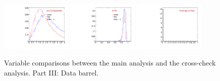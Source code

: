 \begin{figure}
  \includegraphics[width=0.3\textwidth]{Figures/VariablesComparison/Data_barrel_figs/pvips}
  \includegraphics[width=0.3\textwidth]{Figures/VariablesComparison/Data_barrel_figs/pvw8}
  \includegraphics[width=0.3\textwidth]{Figures/VariablesComparison/Data_barrel_figs/KS}
  \caption{Variable comparisons between the main analysis and the cross-check analysis. Part III: Data barrel.}
  \label{fig:Data_barrel_figs}
\end{figure}


